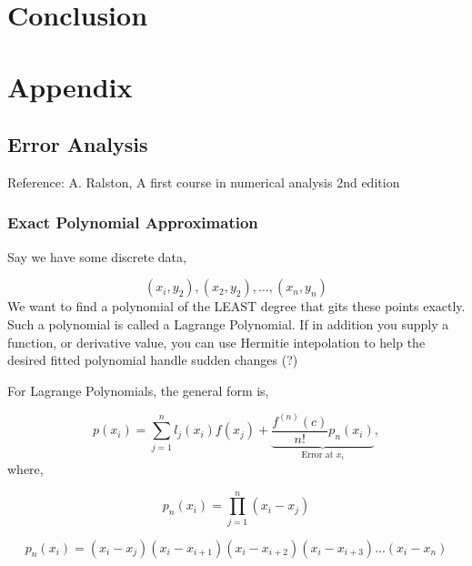 \documentclass[12pt]{article}
\begin{document}


\section{Conclusion}
\section{Appendix}

\subsection{Error Analysis}


Reference: A. Ralston, A first course in numerical analysis 2nd edition

\subsubsection{Exact Polynomial Approximation}


Say we have some discrete data,

\begin{equation*}
    \left( x_{i},y_2 \right),\left( x_2, y_2 \right), \dots , \left( x_n,y_n \right)
\end{equation*}
We want to find a polynomial of the LEAST degree that gits these points exactly. 
Such a polynomial is called a Lagrange Polynomial. If in addition you supply a
function, or derivative value, you can use Hermitie intepolation to help the 
desired fitted polynomial handle sudden changes (?)

For Lagrange Polynomials, the general form is,

\begin{equation*}
    p\left( x_i  \right) =
    \sum_{j=1}^{n} l_j(x_i) f(x_j) + \underbrace{\frac{f^{(n)}\left( c \right)}
    {n!}p_n(x_i)}_{\text{Error at } x_i},
\end{equation*}
where,

\begin{equation*}
    p_n(x_i) = \prod_{j = 1}^{n} \left( x_i - x_j \right) 
\end{equation*}

\begin{equation*}
    p_n(x_i) =  \left( x_{i} - x_{j} \right) 
    \left( x_i - x_{i+1} \right)
    \left( x_i - x_{i+2} \right)
    \left( x_i - x_{i+3} \right) \dots
    ( x_i - x_n)
\end{equation*}
\end{document}
